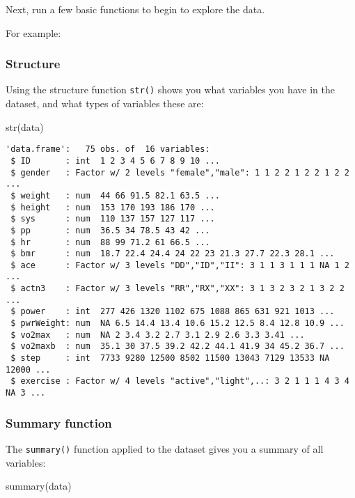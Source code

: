 \documentclass[
  letterpaper,
  DIV=11,
  numbers=noendperiod]{scrartcl}
\newenvironment{Shaded}{\begin{snugshade}}{\end{snugshade}}
\newcommand{\FunctionTok}[1]{\textcolor[rgb]{0.28,0.35,0.67}{#1}}
\newcommand{\NormalTok}[1]{\textcolor[rgb]{0.00,0.23,0.31}{#1}}
\begin{document}
Next, run a few basic functions to begin to explore the data.

For example:

\subsubsection{Structure}\label{structure}

Using the structure function \texttt{str()} shows you what variables you
have in the dataset, and what types of variables these are:

\begin{Shaded}
\begin{Highlighting}[]
\FunctionTok{str}\NormalTok{(data)}
\end{Highlighting}
\end{Shaded}

\begin{verbatim}
'data.frame':   75 obs. of  16 variables:
 $ ID       : int  1 2 3 4 5 6 7 8 9 10 ...
 $ gender   : Factor w/ 2 levels "female","male": 1 1 2 2 1 2 2 1 2 2 ...
 $ weight   : num  44 66 91.5 82.1 63.5 ...
 $ height   : num  153 170 193 186 170 ...
 $ sys      : num  110 137 157 127 117 ...
 $ pp       : num  36.5 34 78.5 43 42 ...
 $ hr       : num  88 99 71.2 61 66.5 ...
 $ bmr      : num  18.7 22.4 24.4 24 22 23 21.3 27.7 22.3 28.1 ...
 $ ace      : Factor w/ 3 levels "DD","ID","II": 3 1 1 3 1 1 1 NA 1 2 ...
 $ actn3    : Factor w/ 3 levels "RR","RX","XX": 3 1 3 2 3 2 1 3 2 2 ...
 $ power    : int  277 426 1320 1102 675 1088 865 631 921 1013 ...
 $ pwrWeight: num  NA 6.5 14.4 13.4 10.6 15.2 12.5 8.4 12.8 10.9 ...
 $ vo2max   : num  NA 2 3.4 3.2 2.7 3.1 2.9 2.6 3.3 3.41 ...
 $ vo2maxb  : num  35.1 30 37.5 39.2 42.2 44.1 41.9 34 45.2 36.7 ...
 $ step     : int  7733 9280 12500 8502 11500 13043 7129 13533 NA 12000 ...
 $ exercise : Factor w/ 4 levels "active","light",..: 3 2 1 1 1 4 3 4 NA 3 ...
\end{verbatim}

\subsubsection{Summary function}\label{summary-function}

The \texttt{summary()} function applied to the dataset gives you a
summary of all variables:

\begin{Shaded}
\begin{Highlighting}[]
\FunctionTok{summary}\NormalTok{(data)}
\end{Highlighting}
\end{Shaded}
\end{document}
